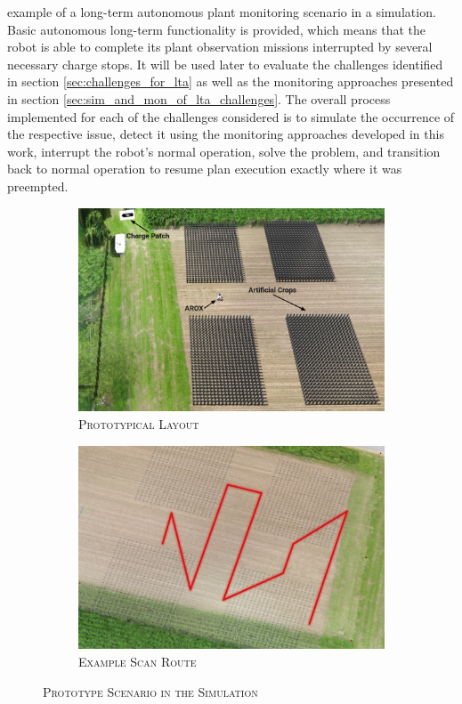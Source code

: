 \documentclass[english, master, utf8]{base/thesis_KBS}
\begin{document}
example of a long-term autonomous plant monitoring scenario in a simulation. Basic autonomous long-term functionality is provided, which means that the robot is able to 
complete its plant observation missions interrupted by several necessary charge stops. It will be used later to evaluate the challenges identified in section 
\ref{sec:challenges_for_lta} as well as the monitoring approaches presented in section \ref{sec:sim_and_mon_of_lta_challenges}.
The overall process implemented for each of the challenges considered is to simulate the occurrence of the respective issue, detect it using
the monitoring approaches developed in this work, interrupt the robot's normal operation, solve the problem, and transition back to normal operation to resume 
plan execution exactly where it was preempted.
\begin{figure}[H]
    \centering
    \begin{subfigure}[b]{0.49\textwidth}
        \centering
        \includegraphics[width=\textwidth]{pics/prototype_scenario.jpg}
        \caption{\textsc{Prototypical Layout}}
        \label{fig:prototypical_layout}
    \end{subfigure}
    \hfill
    \begin{subfigure}[b]{0.49\textwidth}
        \centering
        \includegraphics[width=\textwidth]{pics/example_path.png}
        \caption{\textsc{Example Scan Route}}
        \label{fig:example_scan_route}
    \end{subfigure}
\caption{\textsc{Prototype Scenario in the Simulation}}
\label{fig:prototype_sim}
\end{figure}
\end{document}
